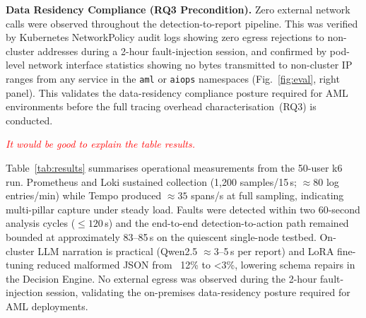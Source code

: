 \documentclass[a4paper]{lipics-v2021}
\begin{document}
\textbf{Data Residency Compliance (RQ3 Precondition).}
Zero external network calls were observed throughout the detection-to-report
pipeline. This was verified by Kubernetes NetworkPolicy audit logs showing zero
egress rejections to non-cluster addresses during a 2-hour fault-injection session,
and confirmed by pod-level network interface statistics showing no bytes transmitted
to non-cluster IP ranges from any service in the \texttt{aml} or \texttt{aiops}
namespaces (Fig.~\ref{fig:eval}, right panel). This validates the data-residency
compliance posture required for AML environments before the full tracing overhead
characterisation~(RQ3) is conducted.

\textit{\textcolor{red} {It would be good to explain the table results.  }}

Table~\ref{tab:results} summarises operational measurements from the 50-user
k6 run. Prometheus and Loki sustained collection (1{,}200 samples/15\,s; ${\approx}80$
log entries/min) while Tempo produced ${\approx}35$ spans/s at full sampling,
indicating multi-pillar capture under steady load. Faults were detected within two
60-second analysis cycles ($\leq120$\,s) and the end-to-end detection-to-action
path remained bounded at approximately 83--85\,s on the quiescent single-node
testbed. On-cluster LLM narration is practical (Qwen2.5 $\approx$3--5\,s per report) and
LoRA fine-tuning reduced malformed JSON from ~12\% to <3\%, lowering schema
repairs in the Decision Engine. No external egress was observed during the
2-hour fault-injection session, validating the on-premises data-residency posture
required for AML deployments.
\end{document}
